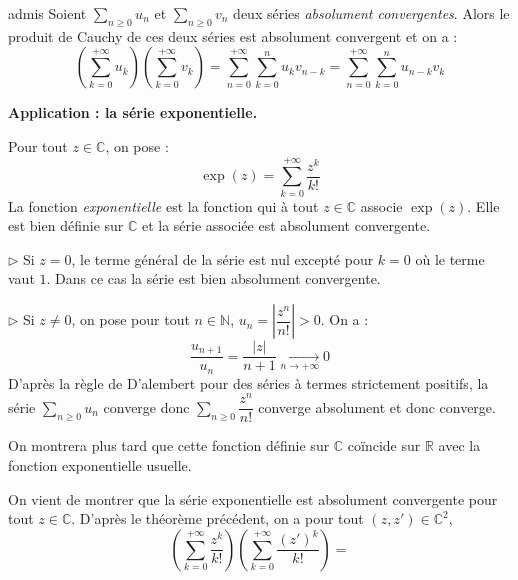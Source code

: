 \documentclass[french,11pt,twoside]{VcCours}
\newcommand{\Sum}[2]{\ensuremath{\textstyle{\sum\limits_{#1}^{#2}}}}
\begin{document}
\medskip

\begin{Theoreme}{admis}
Soient $\Sum{n \geq 0}{} u_n$ et $\Sum{n \geq 0}{} v_n$ deux séries \emph{absolument convergentes}. Alors le produit de Cauchy de ces deux séries est absolument convergent et on a :
$$ \left( \sum_{k=0}^{+ \infty} u_k \right)\left( \sum_{k=0}^{+ \infty} v_k \right) =  \sum_{n=0}^{+ \infty} \sum_{k=0}^n u_k v_{n-k} = \sum_{n=0}^{+ \infty} \sum_{k=0}^n u_{n-k} v_{k}$$
\end{Theoreme}

\textbf{Application : la série exponentielle.}

\begin{TheoremeDefinition}{} Pour tout $z \in \mathbb{C}$, on pose :
$$ \exp(z) = \sum_{k=0}^{+\infty} \frac{z^k}{k!} $$
La fonction \emph{exponentielle} est la fonction qui à tout $z \in \mathbb{C}$ associe $\exp(z)$. Elle est bien définie sur $\mathbb{C}$ et la série associée est absolument convergente.
\end{TheoremeDefinition}

\begin{Demonstration}{} 


$\rhd$ Si $z=0$, le terme général de la série est nul excepté pour $k=0$ où le terme vaut $1$. Dans ce cas la série est bien absolument convergente.

\medskip

$\rhd$ Si $z \neq 0$, on pose pour tout $n \in \mathbb{N}$, $u_n = \left\vert \dfrac{z^n}{n!} \right\vert > 0$. On a :
$$ \frac{u_{n+1}}{u_n} = \frac{\vert z \vert }{n+1} \underset{ n \rightarrow + \infty}{\longrightarrow} 0$$
D'après la règle de D'alembert pour des séries à termes strictement positifs, la série $\Sum{n \geq 0}{} u_n$ converge donc $\Sum{n \geq 0}{}  \dfrac{z^n}{n!} $ converge absolument et donc converge.
\end{Demonstration}

\begin{Remarque}{} On montrera plus tard que cette fonction définie sur $\mathbb{C}$ coïncide sur $\mathbb{R}$ avec la fonction exponentielle usuelle.
\end{Remarque}

On vient de montrer que la série exponentielle est absolument convergente pour tout $z \in \mathbb{C}$. D'après le théorème précédent, on a pour tout $(z,z') \in \mathbb{C}^2$,
$$ \left( \sum_{k=0}^{+ \infty} \frac{z^k}{k!} \right)\left( \sum_{k=0}^{+ \infty}  \frac{(z')^k}{k!} \right) = $$
\end{document}
